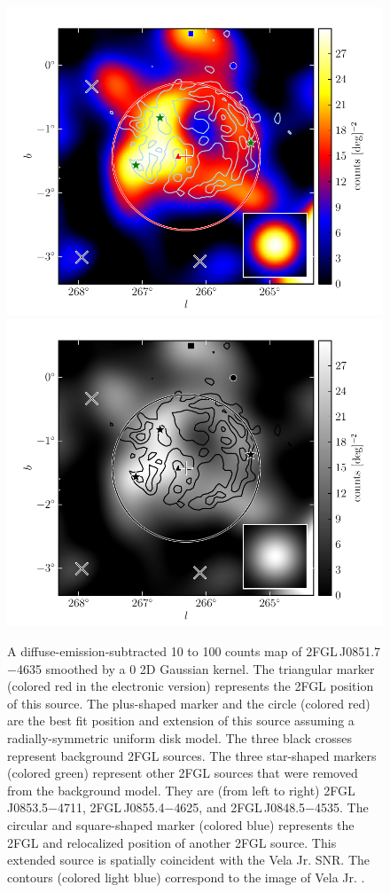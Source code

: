 \begin{figure}[htbp]
    \ifcolorfigure
      \includegraphics{source_plots/source_Vela_Jr_color.pdf}
    \else
      \includegraphics{source_plots/source_Vela_Jr_bw.pdf}
    \fi
  \caption{A diffuse-emission-subtracted 10 \gev to 100 \gev counts map of
  2FGL\,J0851.7$-$4635 smoothed by a 0 2D Gaussian
  kernel. The triangular marker (colored red in the electronic version)
  represents the 2FGL position of this source.  The plus-shaped marker
  and the circle (colored red) are the best fit position and extension of
  this source assuming a radially-symmetric uniform disk model.
  The three black crosses represent background 2FGL sources.
  The three star-shaped markers (colored green) represent other 2FGL sources
  that were removed from the background model.
  They are (from left to right) 2FGL\,J0853.5$-$4711, 2FGL\,J0855.4$-$4625, and 
  2FGL\,J0848.5$-$4535.
  The circular and square-shaped
  marker (colored blue) represents the 2FGL and relocalized position of another 2FGL source.  
  This extended source is spatially
  coincident with the Vela Jr. SNR.  The contours (colored light blue)
  correspond to the \tev image of Vela Jr.
  \citep{aharonian_2007a_h.e.s.s.-observations}.
  }
\end{figure}

